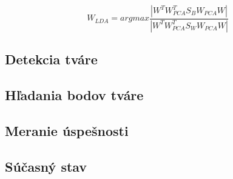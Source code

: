 \begin{equation}\label{eqn:fisher}
W_{LDA} = arg max \frac{|W^T W_{PCA}^T S_B W_{PCA} W|}{|W^T W_{PCA}^T S_W W_{PCA} W|}
\end{equation}


\subsection{Detekcia tváre}
\subsection{Hľadania bodov tváre}
\subsection{Meranie úspešnosti}
\subsection{Súčasný stav}



